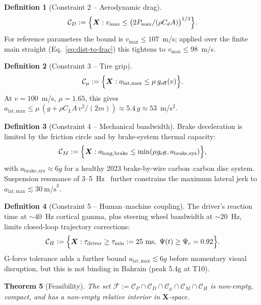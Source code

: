 \documentclass[11pt,twocolumn]{article}
\newtheorem{theorem}{Theorem}[section]
\theoremstyle{definition}
\newtheorem{definition}[theorem]{Definition}
\theoremstyle{remark}
\begin{document}
\begin{definition}[Constraint 2 -- Aerodynamic drag]
\[
  \mathcal{C}_D := \Bigl\{ \bm{X} :
  v_{\max} \le \bigl( 2 P_{\max}/(\rho C_d A) \bigr)^{1/3}
  \Bigr\}.
\]
For reference parameters the bound is $v_{\max} \le 107$~m/s; applied over
the finite main straight (Eq.~\eqref{eq:dist-to-frac}) this tightens to
$v_{\max} \le 98$~m/s.
\end{definition}

\begin{definition}[Constraint 3 -- Tire grip]
\[
  \mathcal{C}_\mu := \Bigl\{ \bm{X} :
  a_{\mathrm{lat,max}} \le \mu\, g_{\mathrm{eff}}(v)
  \Bigr\}.
\]
At $v = 100$~m/s, $\mu = 1.65$, this gives
$a_{\mathrm{lat,max}} \le \mu\,(g + \rho C_L A\, v^2/(2m))
\approx 5.4\,g \approx 53$~m/s$^2$.
\end{definition}

\begin{definition}[Constraint 4 -- Mechanical bandwidth]
Brake deceleration is limited by the friction circle and by brake-system
thermal capacity:
\[
  \mathcal{C}_M := \Bigl\{ \bm{X} :
  a_{\mathrm{long,brake}} \le \min(\mu g_{\mathrm{eff}}, a_{\mathrm{brake,sys}}) \Bigr\},
\]
with $a_{\mathrm{brake,sys}} \approx 6g$ for a healthy 2023 brake-by-wire
carbon--carbon disc system. Suspension resonance of 3--5~Hz~\cite{dixon2007,mastinu1997,genta1997} further
constrains the maximum lateral jerk to
$\dot a_{\mathrm{lat,max}} \lesssim 30~\mathrm{m/s}^3$.
\end{definition}

\begin{definition}[Constraint 5 -- Human--machine coupling]
The driver's reaction time at $\sim 40$~Hz cortical gamma, plus steering
wheel bandwidth at $\sim 20$~Hz, limits closed-loop trajectory corrections:
\[
  \mathcal{C}_H := \Bigl\{ \bm{X} :
  \tau_{\mathrm{driver}} \ge \tau_{\mathrm{min}} := 25~\mathrm{ms},\
  \Psi(t) \ge \Psi_c = 0.92
  \Bigr\}.
\]
G-force tolerance adds a further bound $a_{\mathrm{lat,max}} \lesssim 6g$ before
momentary visual disruption, but this is not binding in Bahrain (peak
5.4g at T10).
\end{definition}

\begin{theorem}[Feasibility]
\label{thm:feasibility}
The set
$\mathcal{F} := \mathcal{C}_P \cap \mathcal{C}_D \cap \mathcal{C}_\mu \cap \mathcal{C}_M \cap \mathcal{C}_H$
is non-empty, compact, and has a non-empty relative interior in
$\bm{X}$-space.
\end{theorem}
\end{document}
